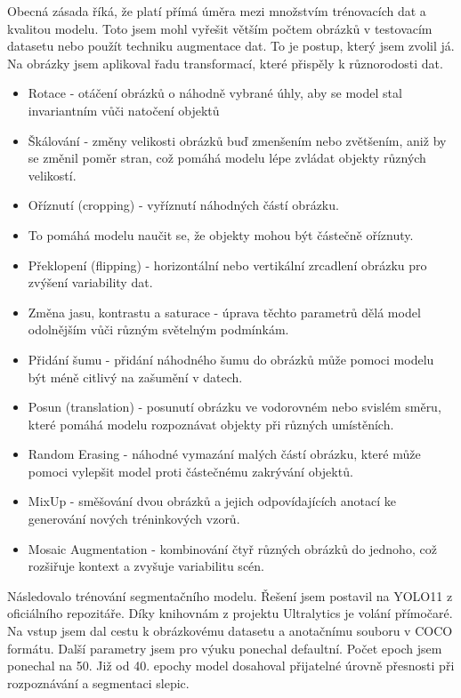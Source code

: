 Obecná zásada říká, že platí přímá úměra mezi množstvím trénovacích dat a kvalitou modelu.
Toto jsem mohl vyřešit větším počtem obrázků v testovacím datasetu nebo použít techniku augmentace dat.
To je postup, který jsem zvolil já. Na obrázky jsem aplikoval řadu transformací, které přispěly k různorodosti dat.

\begin{itemize}
    \item Rotace - otáčení obrázků o náhodně vybrané úhly, aby se model stal invariantním vůči natočení objektů
    \item Škálování - změny velikosti obrázků buď zmenšením nebo zvětšením, aniž by se změnil poměr stran, což pomáhá modelu lépe zvládat objekty různých velikostí.
    \item Oříznutí (cropping) - vyříznutí náhodných částí obrázku.
    \item To pomáhá modelu naučit se, že objekty mohou být částečně oříznuty.
    \item Překlopení (flipping) - horizontální nebo vertikální zrcadlení obrázku pro zvýšení variability dat.
    \item Změna jasu, kontrastu a saturace - úprava těchto parametrů dělá model odolnějším vůči různým světelným podmínkám.
    \item Přidání šumu - přidání náhodného šumu do obrázků může pomoci modelu být méně citlivý na zašumění v datech.
    \item Posun (translation) - posunutí obrázku ve vodorovném nebo svislém směru, které pomáhá modelu rozpoznávat objekty při různých umístěních.
    \item Random Erasing - náhodné vymazání malých částí obrázku, které může pomoci vylepšit model proti částečnému zakrývání objektů.
    \item MixUp - směšování dvou obrázků a jejich odpovídajících anotací ke generování nových tréninkových vzorů.
    \item Mosaic Augmentation - kombinování čtyř různých obrázků do jednoho, což rozšiřuje kontext a zvyšuje variabilitu scén.
\end{itemize}

Následovalo trénování segmentačního modelu.
Řešení jsem postavil na YOLO11 z oficiálního repozitáře.
Díky knihovnám z projektu Ultralytics je volání přímočaré.
Na vstup jsem dal cestu k obrázkovému datasetu a anotačnímu souboru v COCO formátu.
Další parametry jsem pro výuku ponechal defaultní.
Počet epoch jsem ponechal na 50.
Již od 40. epochy model dosahoval přijatelné úrovně přesnosti při rozpoznávání a segmentaci slepic.


